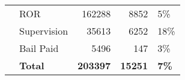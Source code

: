 \documentclass{article}
\begin{document}
\begin{table}
\begin{tabular}{rlrr|>{}l}
        \midrule
        \cmidrule{1-5}
                                                                   & ROR            & 162288          & 8852           & 5\%           \\
        \cmidrule{2-5}
                                                                   & Supervision    & 35613           & 6252           & 18\%          \\
        \cmidrule{2-5}
                                                                   & Bail Paid      & 5496            & 147            & 3\%           \\
        \cmidrule{2-5}
        \textbf{\multirow{-4}{*}{\raggedleft\arraybackslash 2024}} & \textbf{Total} & \textbf{203397} & \textbf{15251} & \textbf{7\%}  \\
        \midrule
        \hline
        \bottomrule
    \end{tabular}
\end{table}
\end{document}

